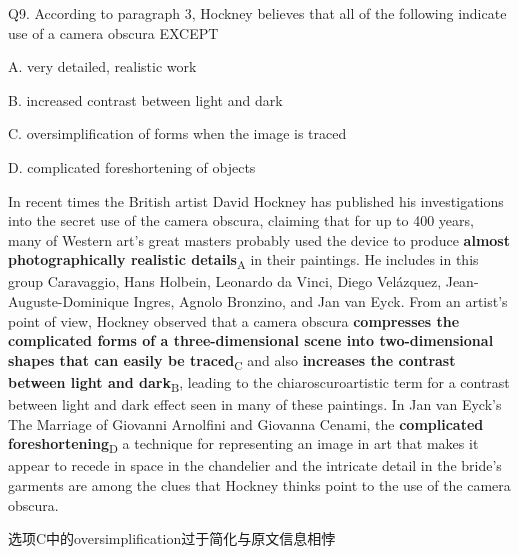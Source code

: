 \begin{blk}
    \begin{qst}
        Q9. According to paragraph 3, Hockney believes that all of the following indicate use of a camera obscura EXCEPT
    \end{qst}

    \begin{chc}
        A. very detailed, realistic work

        B. increased contrast between light and dark

        C. oversimplification of forms when the image is traced

        D. complicated foreshortening of objects
    \end{chc}

    \begin{psgq}
        In recent times the British artist David Hockney has published his investigations into the secret use of the camera obscura, claiming that for up to 400 years, many of Western art’s great masters probably used the device to produce \textbf{almost photographically realistic details}\textsubscript{A} in their paintings. He includes in this group Caravaggio, Hans Holbein, Leonardo da Vinci, Diego Velázquez, Jean-Auguste-Dominique Ingres, Agnolo Bronzino, and Jan van Eyck. From an artist’s point of view, Hockney observed that a camera obscura \textbf{compresses the complicated forms of a three-dimensional scene into two-dimensional shapes that can easily be traced}\textsubscript{C} and also \textbf{increases the contrast between light and dark}\textsubscript{B}, leading to the chiaroscuroartistic term for a contrast between light and dark effect seen in many of these paintings. In Jan van Eyck’s The Marriage of Giovanni Arnolfini and Giovanna Cenami, the \textbf{complicated foreshortening}\textsubscript{D} a technique for representing an image in art that makes it appear to recede in space in the chandelier and the intricate detail in the bride’s garments are among the clues that Hockney thinks point to the use of the camera obscura.
    \end{psgq}

    \begin{nlz}
        选项C中的oversimplification过于简化与原文信息相悖
    \end{nlz}
\end{blk}
